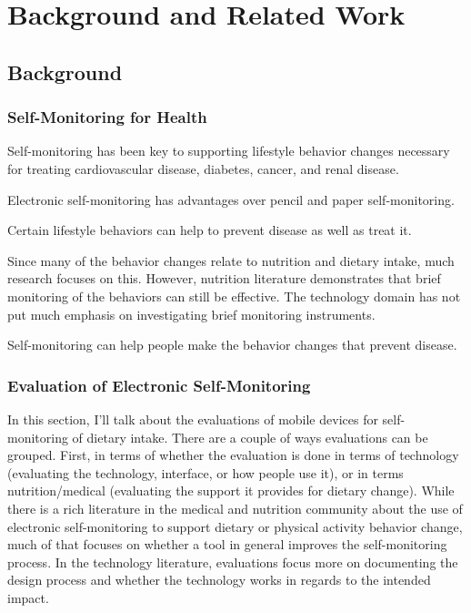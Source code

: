 \chapter{Background and Related Work}



\section{Background}
\subsection{Self-Monitoring for Health}
Self-monitoring has been key to supporting lifestyle behavior changes necessary for treating cardiovascular disease, diabetes, cancer, and renal disease. 

Electronic self-monitoring has advantages over pencil and paper self-monitoring. 

Certain lifestyle behaviors can help to prevent disease as well as treat it. 

Since many of the behavior changes relate to nutrition and dietary intake, much research focuses on this. However, nutrition literature demonstrates that brief monitoring of the behaviors can still be effective. The technology domain has not put much emphasis on investigating brief monitoring instruments. 

Self-monitoring can help people make the behavior changes that prevent disease. 



\subsection{Evaluation of Electronic Self-Monitoring}
In this section, I'll talk about the evaluations of mobile devices for self-monitoring of dietary intake. There are a couple of ways evaluations can be grouped. First, in terms of whether the evaluation is done in terms of technology (evaluating the technology, interface, or how people use it), or in terms nutrition/medical (evaluating the support it provides for dietary change). While there is a rich literature in the medical and nutrition community about the use of electronic self-monitoring to support dietary or physical activity behavior change, much of that focuses on whether a tool in general improves the self-monitoring process. In the technology literature, evaluations focus more on documenting the design process and whether the technology works in regards to the intended impact. 

